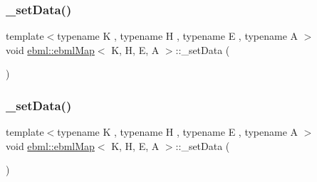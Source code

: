 \mbox{\label{classebml_1_1ebmlMap_a9779497bcff6f45ae7081e319155376b}} 
\subsubsection{\texorpdfstring{\+\_\+set\+Data()}{\_setData()}\hspace{0.1cm}{\footnotesize\ttfamily [2/4]}}
{\footnotesize\ttfamily template$<$typename K , typename H , typename E , typename A $>$ \\
void \mbox{\hyperlink{classebml_1_1ebmlMap}{ebml\+::ebml\+Map}}$<$ K, H, E, A $>$\+::\+\_\+set\+Data (\begin{DoxyParamCaption}\item[{std\+::list$<$ \mbox{\hyperlink{namespaceebml_adad533b7705a16bb360fe56380c5e7be}{ebml\+Element\+\_\+sp}} $>$ \&\&}]{ }\end{DoxyParamCaption})\hspace{0.3cm}{\ttfamily [protected]}}

\mbox{\label{classebml_1_1ebmlMap_a881bfc53cc7f774c9a3aaf79ee6c9e9b}} 
\subsubsection{\texorpdfstring{\+\_\+set\+Data()}{\_setData()}\hspace{0.1cm}{\footnotesize\ttfamily [3/4]}}
{\footnotesize\ttfamily template$<$typename K , typename H , typename E , typename A $>$ \\
void \mbox{\hyperlink{classebml_1_1ebmlMap}{ebml\+::ebml\+Map}}$<$ K, H, E, A $>$\+::\+\_\+set\+Data (\begin{DoxyParamCaption}\item[{const std\+::unordered\+\_\+map$<$ K, \mbox{\hyperlink{namespaceebml_adad533b7705a16bb360fe56380c5e7be}{ebml\+Element\+\_\+sp}}, H, E, A $>$ \&}]{ }\end{DoxyParamCaption})\hspace{0.3cm}{\ttfamily [protected]}}

\mbox{\label{classebml_1_1ebmlMap_a0b394fd2545a526334ab909fdb07b1bd}} 
